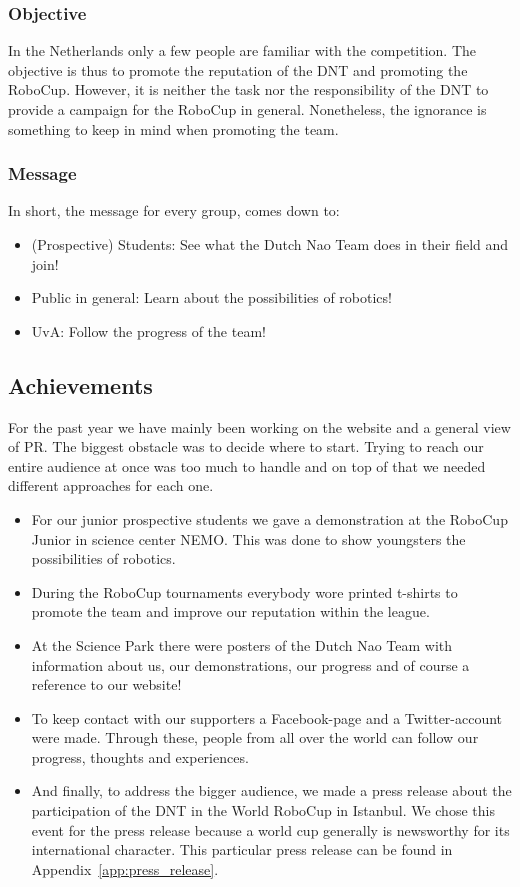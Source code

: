 \documentclass[a4paper]{article}
\begin{document}
\subsubsection{Objective}
In the Netherlands only a few people are familiar with the competition. The objective is thus to promote the reputation of the DNT and promoting the RoboCup. However, it is neither the task nor the responsibility of the DNT to provide a campaign for the RoboCup in general. Nonetheless, the ignorance is something to keep in mind when promoting the team.

\subsubsection{Message}
In short, the message for every group, comes down to:
\begin{itemize}
\item (Prospective) Students: See what the Dutch Nao Team does in their field and join!
\item Public in general: Learn about the possibilities of robotics!
\item UvA: Follow the progress of the team!
\end{itemize}

\subsection{Achievements}
For the past year we have mainly been working on the website and a general view of PR. The biggest obstacle was to decide where to start. Trying to reach our entire audience at once was too much to handle and on top of that we needed different approaches for each one.
\begin{itemize}
\item For our junior prospective students we gave a demonstration at the RoboCup Junior in science center NEMO. This was done to show youngsters the possibilities of robotics.
\item During the RoboCup tournaments everybody wore printed t-shirts to promote the team and improve our reputation within the league. 
\item At the Science Park there were posters of the Dutch Nao Team with information about us, our demonstrations, our progress and of course a reference to our website!
\item To keep contact with our supporters a Facebook-page and a Twitter-account were made. Through these, people from all over the world can follow our progress, thoughts and experiences.
\item And finally, to address the bigger audience, we made a press release about the participation of the DNT in the World RoboCup in Istanbul. We chose this event for the press release because a world cup generally is newsworthy for its international character. This particular press release can be found in Appendix~\ref{app:press_release}.
\end{itemize}
\end{document}
